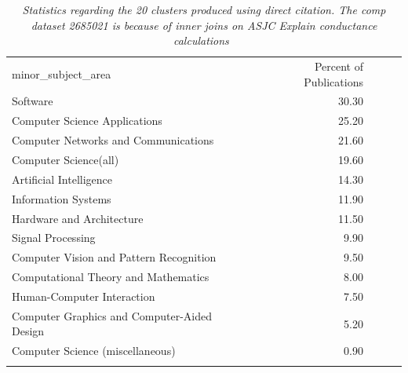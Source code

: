 \begin{table}[ht]
\caption{\emph{Statistics regarding the 20 clusters produced using direct citation. The \emph{comp} dataset 
2685021 is because of inner joins on ASJC Explain conductance calculations~\cite{shun_parallel_2016}}}
\label{tab:comp}       
\begin{tabular}{lrccc}
\hline\noalign{\smallskip}
minor\_subject\_area & Percent of Publications \\
\noalign{\smallskip}\hline\noalign{\smallskip}
Software & 30.30 \\ 
Computer Science Applications & 25.20 \\ 
Computer Networks and Communications & 21.60 \\ 
Computer Science(all) & 19.60 \\ 
Artificial Intelligence & 14.30 \\ 
Information Systems & 11.90 \\ 
Hardware and Architecture & 11.50 \\ 
Signal Processing & 9.90 \\ 
Computer Vision and Pattern Recognition & 9.50 \\ 
Computational Theory and Mathematics & 8.00 \\ 
Human-Computer Interaction & 7.50 \\ 
Computer Graphics and Computer-Aided Design & 5.20 \\ 
Computer Science (miscellaneous) & 0.90 \\ 
\noalign{\smallskip}\hline
\end{tabular}
\end{table}
\newpage


